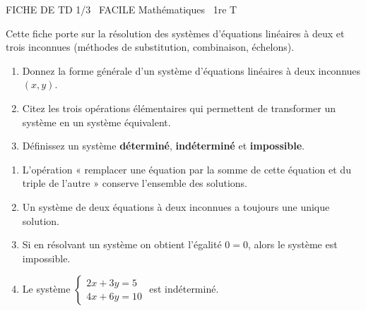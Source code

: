 \documentclass[11pt]{article}
\begin{document}
\begin{tcolorbox}[enhanced,colback=popink,colframe=popink,arc=10pt,boxrule=0pt,left=12pt,right=12pt,top=9pt,bottom=9pt]
{\color{white}\popxbold\small FICHE DE TD 1/3 \textbullet\ FACILE \hfill Mathématiques \textbullet\ 1re T\par}
\end{tcolorbox}
\vspace{4pt}
\noindent Cette fiche porte sur la résolution des systèmes d'équations linéaires à deux et trois inconnues (méthodes de substitution, combinaison, échelons).

\begin{exercice}
\begin{enumerate}
    \item Donnez la forme générale d'un système d'équations linéaires à deux inconnues $(x, y)$.
    \item Citez les trois opérations élémentaires qui permettent de transformer un système en un système équivalent.
    \item Définissez un système \textbf{déterminé}, \textbf{indéterminé} et \textbf{impossible}.
\end{enumerate}
\end{exercice}

\begin{exercice}
\begin{enumerate}
    \item L'opération « remplacer une équation par la somme de cette équation et du triple de l'autre » conserve l'ensemble des solutions.
    \item Un système de deux équations à deux inconnues a toujours une unique solution.
    \item Si en résolvant un système on obtient l'égalité $0 = 0$, alors le système est impossible.
    \item Le système $\left\{\begin{array}{l} 2x + 3y = 5 \\ 4x + 6y = 10 \end{array}\right.$ est indéterminé.
\end{enumerate}
\end{exercice}
\end{document}
